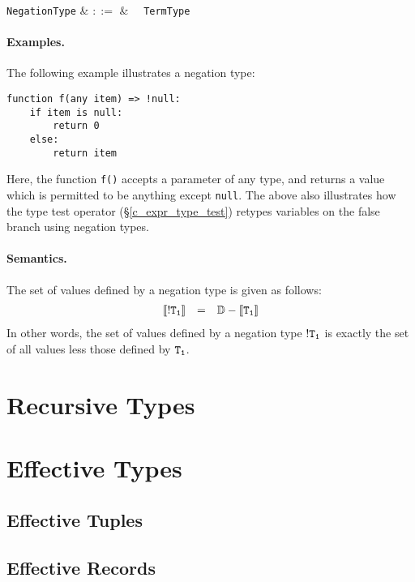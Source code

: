 \begin{syntax}
  \verb+NegationType+ & $::=$ & \token{!}\ \ \verb+TermType+\\
\end{syntax}

\paragraph{Examples.}  The following example illustrates a negation type:

\begin{lstlisting}
function f(any item) => !null:
    if item is null:
        return 0
    else:
        return item
\end{lstlisting}
Here, the function \lstinline{f()} accepts a parameter of any type, and returns a value which is permitted to be anything except \lstinline{null}.  The above also illustrates how the type test operator (\S\ref{c_expr_type_test}) retypes variables on the false branch using negation types.

\paragraph{Semantics.}  The set of values defined by a negation type is given as follows:
\begin{displaymath}
\begin{array}{rcl}
{\tt\llbracket!T_1\rrbracket} & = & {\tt \mathbb{D} - \llbracket T_1\rrbracket}\\
\end{array}
\end{displaymath}
In other words, the set of values defined by a negation type ${\tt !T_1}$ is exactly the set of all values less those defined by ${\tt T_1}$.

\section{Recursive Types}
\label{c_types_recursive}

\section{Effective Types}
\label{c_types_effective}

\subsection{Effective Tuples}
\subsection{Effective Records}
\label{c_types_effective_records}
